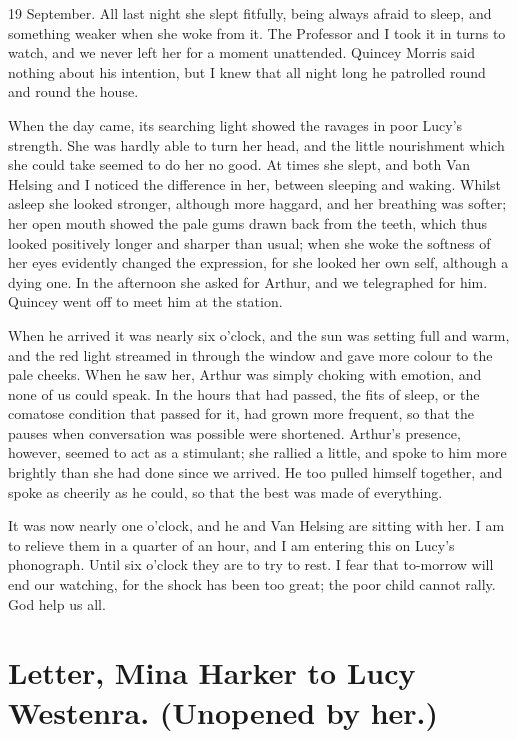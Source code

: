 \begin{diary}{19 September.}
All last night she slept fitfully, being always afraid to sleep, and something weaker when she woke from it. The Professor and I took it in turns to watch, and we never left her for a moment unattended. Quincey Morris said nothing about his intention, but I knew that all night long he patrolled round and round the house.

When the day came, its searching light showed the ravages in poor Lucy's strength. She was hardly able to turn her head, and the little nourishment which she could take seemed to do her no good. At times she slept, and both Van Helsing and I noticed the difference in her, between sleeping and waking. Whilst asleep she looked stronger, although more haggard, and her breathing was softer; her open mouth showed the pale gums drawn back from the teeth, which thus looked positively longer and sharper than usual; when she woke the softness of her eyes evidently changed the expression, for she looked her own self, although a dying one. In the afternoon she asked for Arthur, and we telegraphed for him. Quincey went off to meet him at the station.

When he arrived it was nearly six o'clock, and the sun was setting full and warm, and the red light streamed in through the window and gave more colour to the pale cheeks. When he saw her, Arthur was simply choking with emotion, and none of us could speak. In the hours that had passed, the fits of sleep, or the comatose condition that passed for it, had grown more frequent, so that the pauses when conversation was possible were shortened. Arthur's presence, however, seemed to act as a stimulant; she rallied a little, and spoke to him more brightly than she had done since we arrived. He too pulled himself together, and spoke as cheerily as he could, so that the best was made of everything.

It was now nearly one o'clock, and he and Van Helsing are sitting with her. I am to relieve them in a quarter of an hour, and I am entering this on Lucy's phonograph. Until six o'clock they are to try to rest. I fear that to-morrow will end our watching, for the shock has been too great; the poor child cannot rally. God help us all.
\end{diary}

\begin{letter}
	\clearpage
\end{letter}
\section{Letter, Mina Harker to Lucy Westenra. (Unopened by her.)}


